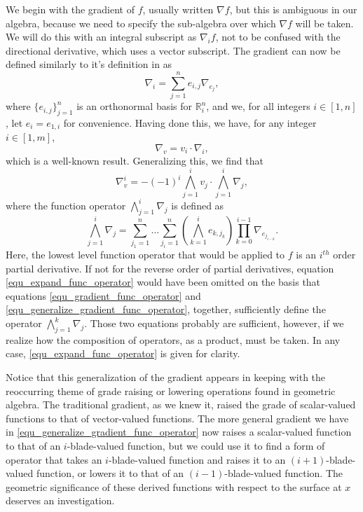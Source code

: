 \documentclass{birkjour}
\theoremstyle{definition}
\theoremstyle{remark}
\numberwithin{equation}{section}
\newcommand{\R}{\mathbb{R}}
\begin{document}
We begin with the gradient of $f$, usually written $\nabla f$, but this is ambiguous in our algebra,
because we need to specify the sub-algebra over which $\nabla f$ will be taken.  We will
do this with an integral subscript as $\nabla_i f$, not to be confused with the directional
derivative, which uses a vector subscript.  The gradient can now be defined similarly to
it's definition in \cite{Macdonald12} as
\begin{equation}\label{equ_gradient_func_operator}
\nabla_i = \sum_{j=1}^n e_{i,j}\nabla_{e_j},
\end{equation}
where $\{e_{i,j}\}_{j=1}^n$ is an orthonormal basis for $\R^n_i$, and
we, for all integers $i\in[1,n]$, let $e_i=e_{1,i}$ for convenience.
Having done this, we have, for any integer $i\in[1,m]$,
\begin{equation*}
\nabla_v = v_i\cdot\nabla_i,
\end{equation*}
which is a well-known result.  Generalizing this, we find that
\begin{equation}\label{equ_generalize_gradient_func_operator}
\nabla_v^i = -(-1)^i\bigwedge_{j=1}^i v_j\cdot\bigwedge_{j=1}^i\nabla_j,
\end{equation}
where the function operator $\bigwedge_{j=1}^i\nabla_j$ is defined as
\begin{equation}\label{equ_expand_func_operator}
\bigwedge_{j=1}^i\nabla_j =
\sum_{j_1=1}^n\dots\sum_{j_i=1}^n\left(\bigwedge_{k=1}^i
e_{k,j_k}\right)\prod_{k=0}^{i-1}\nabla_{e_{j_{i-k}}}.
\end{equation}
Here, the lowest level function operator that would be applied to $f$ is an $i^{th}$ order partial derivative.
If not for the reverse order of partial derivatives, equation \eqref{equ_expand_func_operator}
would have been omitted on
the basis that equations \eqref{equ_gradient_func_operator} and
\eqref{equ_generalize_gradient_func_operator}, together, sufficiently
define the operator $\bigwedge_{j=1}^k\nabla_j$.  Those two equations
probably are sufficient, however, if we realize how the composition of operators, as a product,
must be taken.  In any case, \eqref{equ_expand_func_operator} is given for clarity.

Notice that this generalization of the gradient appears in keeping with the reoccurring theme
of grade raising or lowering operations found in geometric algebra.  The traditional gradient,
as we knew it, raised the grade of scalar-valued functions to that of vector-valued functions.
The more general gradient we have in \eqref{equ_generalize_gradient_func_operator} now raises a scalar-valued function to that
of an $i$-blade-valued function, but we could use it to find a form of operator that takes an
$i$-blade-valued function and raises it to an $(i+1)$-blade-valued function, or lowers it
to that of an $(i-1)$-blade-valued function.  The geometric significance of these derived
functions with respect to the surface at $x$ deserves an investigation.
\end{document}
